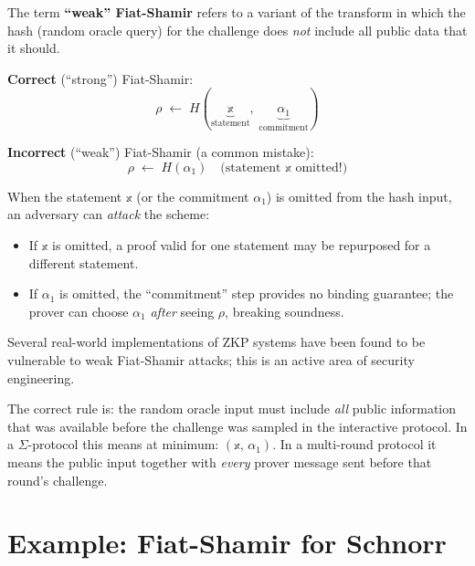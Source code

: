 \documentclass[11pt]{article}
\begin{document}
\begin{tcolorbox}[colback=red!5, colframe=red!60!black,
                  title={``Weak'' Fiat-Shamir Attacks}]
  The term \textbf{``weak'' Fiat-Shamir} refers to a variant of the
  transform in which the hash (random oracle query) for the challenge
  does \emph{not} include all public data that it should.

  \medskip
  \textbf{Correct} (``strong'') Fiat-Shamir:
  \[
    \rho \;\leftarrow\; H(\underbrace{\mathbb{x}}_{\text{statement}},\;
                          \underbrace{\alpha_1}_{\text{commitment}})
  \]

  \medskip
  \textbf{Incorrect} (``weak'') Fiat-Shamir (a common mistake):
  \[
    \rho \;\leftarrow\; H(\alpha_1) \quad \text{(statement $\mathbb{x}$ omitted!)}
  \]

  \medskip
  When the statement $\mathbb{x}$ (or the commitment $\alpha_1$) is
  omitted from the hash input, an adversary can \emph{attack} the
  scheme:
  \begin{itemize}
    \item If $\mathbb{x}$ is omitted, a proof valid for one statement
          may be repurposed for a different statement.
    \item If $\alpha_1$ is omitted, the ``commitment'' step provides
          no binding guarantee; the prover can choose $\alpha_1$
          \emph{after} seeing $\rho$, breaking soundness.
  \end{itemize}

  Several real-world implementations of ZKP systems have been found to
  be vulnerable to weak Fiat-Shamir attacks; this is an active area of
  security engineering.
\end{tcolorbox}

\begin{remark}
  The correct rule is: the random oracle input must include
  \emph{all} public information that was available before the
  challenge was sampled in the interactive protocol.  In a
  $\Sigma$-protocol this means at minimum:
  $(\mathbb{x},\, \alpha_1)$.
  In a multi-round protocol it means the public input together with
  \emph{every} prover message sent before that round's challenge.
\end{remark}

\section{Example: Fiat-Shamir for Schnorr}
\end{document}
